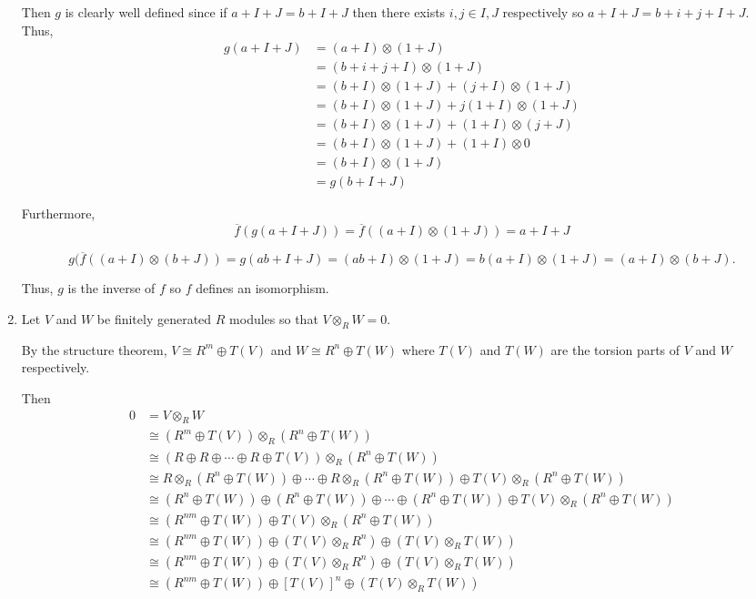 \documentclass[12pt]{AlgebraQual}
\begin{document}
\begin{solution}
\begin{enumerate}[label=(\alph*)]
    Then $g$ is clearly well defined since if $a+I+J=b+I+J$ then there exists $i,j\in I,J$ respectively so $a+I+J=b+i+j+I+J$. Thus, \begin{align*}
        g(a+I+J)&=(a+I)\otimes(1+J)\\
        &=(b+i+j+I)\otimes(1+J)\\
        &=(b+I)\otimes(1+J)+(j+I)\otimes(1+J)\\
        &=(b+I)\otimes(1+J)+j(1+I)\otimes(1+J)\\
        &=(b+I)\otimes(1+J)+(1+I)\otimes(j+J)\\
        &=(b+I)\otimes(1+J)+(1+I)\otimes0\\
        &=(b+I)\otimes(1+J)\\
        &=g(b+I+J)
    \end{align*}

    Furthermore, $$\overline{f}(g(a+I+J))=\overline{f}((a+I)\otimes(1+J))=a+I+J$$

    $$g(\overline{f}((a+I)\otimes(b+J))=g(ab+I+J)=(ab+I)\otimes(1+J)=b(a+I)\otimes(1+J)=(a+I)\otimes(b+J).$$

    Thus, $g$ is the inverse of $f$ so $f$ defines an isomorphism.
    \item Let $V$ and $W$ be finitely generated $R$ modules so that $V\otimes_RW=0$.

    By the structure theorem, $V\cong R^m\oplus T(V)$ and $W\cong R^n\oplus T(W)$ where $T(V)$ and $T(W)$ are the torsion parts of $V$ and $W$ respectively.

    Then \begin{align*}
        0&=V\otimes_RW\\
        &\cong(R^m\oplus T(V))\otimes_R(R^n\oplus T(W))\\
        &\cong(R\oplus R\oplus\cdots\oplus R\oplus T(V))\otimes_R(R^n\oplus T(W))\\
        &\cong R\otimes_R(R^n\oplus T(W))\oplus \cdots\oplus R\otimes_R(R^n\oplus T(W))\oplus T(V)\otimes_R(R^n\oplus T(W))\\
        &\cong (R^n\oplus T(W))\oplus (R^n\oplus T(W))\oplus\cdots\oplus (R^n\oplus T(W))\oplus T(V)\otimes_R(R^n\oplus T(W))\\
        &\cong (R^{nm}\oplus T(W))\oplus T(V)\otimes_R(R^n\oplus T(W))\\
        &\cong (R^{nm}\oplus T(W))\oplus (T(V)\otimes_R R^n)\oplus (T(V)\otimes_R T(W))\\
        &\cong (R^{nm}\oplus T(W))\oplus (T(V)\otimes_R R^n)\oplus (T(V)\otimes_R T(W))\\
        &\cong (R^{nm}\oplus T(W))\oplus [T(V)]^n \oplus (T(V)\otimes_R T(W))
    \end{align*}


\end{enumerate}
\end{solution}
\end{document}
